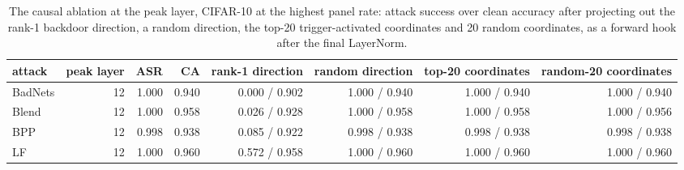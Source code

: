 \begin{table}[htbp]
\centering
\small
\caption{The causal ablation at the peak layer, CIFAR-10 at the highest panel rate: attack success over clean accuracy after projecting out the rank-1 backdoor direction, a random direction, the top-20 trigger-activated coordinates and 20 random coordinates, as a forward hook after the final LayerNorm.}
\label{tab:direction-ablation}
\begin{adjustbox}{max width=\linewidth}
\begin{tabular}{lrrrrrrr}
\toprule
attack & peak layer & ASR & CA & rank-1 direction & random direction & top-20 coordinates & random-20 coordinates \\
\midrule
BadNets & 12 & 1.000 & 0.940 & 0.000 / 0.902 & 1.000 / 0.940 & 1.000 / 0.940 & 1.000 / 0.940 \\
Blend & 12 & 1.000 & 0.958 & 0.026 / 0.928 & 1.000 / 0.958 & 1.000 / 0.958 & 1.000 / 0.956 \\
BPP & 12 & 0.998 & 0.938 & 0.085 / 0.922 & 0.998 / 0.938 & 0.998 / 0.938 & 0.998 / 0.938 \\
LF & 12 & 1.000 & 0.960 & 0.572 / 0.958 & 1.000 / 0.960 & 1.000 / 0.960 & 1.000 / 0.960 \\
\bottomrule
\end{tabular}
\end{adjustbox}
\end{table}
